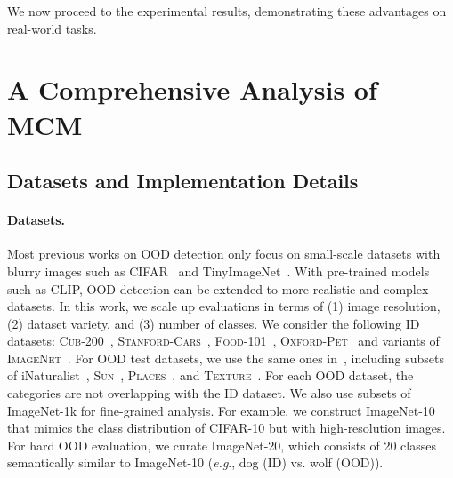 \documentclass{article}
\def\eg{\emph{e.g}., }
\begin{document}
We now proceed to the experimental results, demonstrating these advantages on real-world tasks. 


\section{A Comprehensive Analysis of MCM}
\label{sec:exp}
\subsection{Datasets and Implementation Details}
\paragraph{Datasets.}
Most previous works on OOD detection only focus on small-scale datasets with blurry images such as CIFAR~\cite{krizhevsky2009learning} and TinyImageNet~\cite{le2015tiny}. With
pre-trained
models such as CLIP,
OOD detection can be  extended to more realistic and complex datasets.
In this work, we scale up evaluations in terms of (1) image resolution, (2) dataset variety, and (3) number of classes.  We consider the following ID datasets: \textsc{Cub-200}~\cite{WahCUB_200_2011}, \textsc{Stanford-Cars}~\cite{KrauseStarkDengFei-Fei_3DRR2013}, \textsc{Food-101}~\cite{bossard14},  \textsc{Oxford-Pet}~\cite{parkhi12a} and variants of \textsc{ImageNet}~\cite{deng2009imagenet}. For OOD test datasets, we use the same ones in~\cite{huang2021mos}, including subsets of iNaturalist~\cite{van2018inaturalist}, \textsc{Sun}~\cite{xiao2010sun}, \textsc{Places}~\cite{zhou2017places}, and \textsc{Texture}~\cite{cimpoi2014describing}. For each OOD dataset, the categories are not overlapping with the ID dataset.
We also use subsets of ImageNet-1k for
fine-grained
analysis. For example, we construct ImageNet-10 that mimics the class distribution of CIFAR-10 but with high-resolution images. For hard OOD evaluation, we curate ImageNet-20, which consists of 20 classes semantically similar  to ImageNet-10 (\eg dog (ID) vs. wolf (OOD)). 
\end{document}
